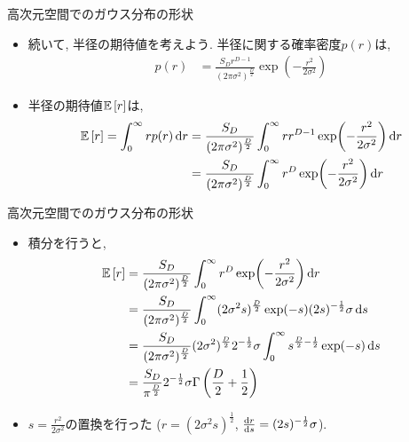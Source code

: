 \documentclass[dvipdfmx,notheorems,t]{beamer}
\begin{document}
\begin{frame}{高次元空間でのガウス分布の形状}
\begin{itemize}
  \item 続いて, 半径の期待値を考えよう. 半径に関する確率密度$p(r)$は,
  \begin{align*}
    p(r) &= \frac{S_D r^{D - 1}}{(2\pi \sigma^2)^\frac{D}{2}} \exp(-\frac{r^2}{2 \sigma^2})
  \end{align*}
  \item 半径の期待値$\operatorname{\mathbb{E}} \left[ r \right]$は,
  \begin{align*}
    \operatorname{\mathbb{E}} \left[ r \right] = \int_0^\infty r p(r) \dd{r}
      &= \frac{S_D}{(2\pi \sigma^2)^\frac{D}{2}} \int_0^\infty r r^{D - 1} \exp(-\frac{r^2}{2 \sigma^2}) \dd{r} \\
      &= \frac{S_D}{(2\pi \sigma^2)^\frac{D}{2}} \int_0^\infty r^D \exp(-\frac{r^2}{2 \sigma^2}) \dd{r}
  \end{align*}
\end{itemize}
\end{frame}

\begin{frame}{高次元空間でのガウス分布の形状}
\begin{itemize}
  \item 積分を行うと,
  \begin{align*}
    \operatorname{\mathbb{E}} \left[ r \right] &= \frac{S_D}{(2\pi \sigma^2)^\frac{D}{2}} \int_0^\infty r^D \exp(-\frac{r^2}{2 \sigma^2}) \dd{r} \\
      &= \frac{S_D}{(2\pi \sigma^2)^\frac{D}{2}}
        \int_0^\infty (2 \sigma^2 s)^\frac{D}{2} \exp(-s) (2s)^{-\frac{1}{2}} \sigma \dd{s} \\
      &= \frac{S_D}{(2\pi \sigma^2)^\frac{D}{2}} (2\sigma^2)^\frac{D}{2} 2^{-\frac{1}{2}} \sigma
        \int_0^\infty s^{\frac{D}{2} - \frac{1}{2}} \exp(-s) \dd{s} \\
      &= \frac{S_D}{\pi^\frac{D}{2}} 2^{-\frac{1}{2}} \sigma \Gamma \left( \frac{D}{2} + \frac{1}{2} \right)
  \end{align*}

  \item $s = \frac{r^2}{2 \sigma^2}$の置換を行った
  ($r = (2\sigma^2 s)^\frac{1}{2}$, $\dv{r}{s} = (2s)^{-\frac{1}{2}} \sigma$).
\end{itemize}
\end{frame}
\end{document}
